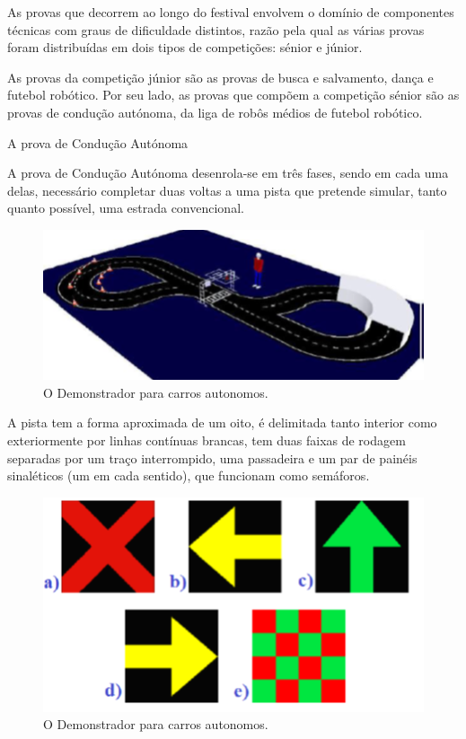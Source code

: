 \documentclass[a4paper,10pt]{texRel}
\begin{document}
As provas que decorrem ao longo do festival envolvem o domínio de componentes técnicas com graus de dificuldade distintos, razão pela qual as várias provas foram distribuídas em dois tipos de competições: sénior e júnior.

As provas da competição júnior são as provas de busca e salvamento, dança e futebol robótico. Por seu lado, as provas que compõem a competição sénior são as provas de condução autónoma, da liga de robôs médios de futebol robótico.

A prova de Condução Autónoma

A prova de Condução Autónoma desenrola-se em três fases, sendo em cada uma delas, necessário completar duas voltas a uma pista que pretende simular, tanto quanto possível, uma estrada convencional. 

\begin{figure}[H]
\centering
\includegraphics{pista_FNR.png}
\caption{O Demonstrador para carros autonomos.}
\label{fig1_FNR}
\end{figure}

A pista tem a forma aproximada de um oito, é delimitada tanto interior como exteriormente por linhas contínuas brancas, tem duas faixas de rodagem separadas por um traço interrompido, uma passadeira e um par de painéis sinaléticos (um em cada sentido), que funcionam como semáforos. 

\begin{figure}[H]
\centering
\includegraphics{signals_FNR.png}
\caption{O Demonstrador para carros autonomos.}
\label{fig2_FNR}
\end{figure}
\end{document}
